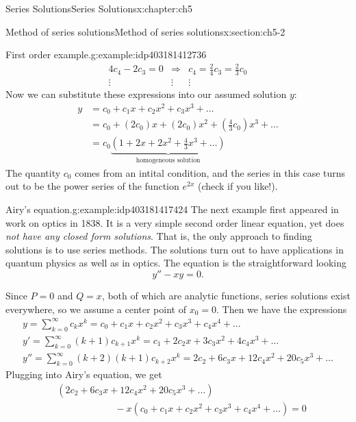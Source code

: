 \documentclass[oneside,10pt,]{book}
\numberwithin{equation}{section}
\numberwithin{equation}{section}
\newcommand{\amp}{&}
\begin{document}
\begin{chapterptx}{Series Solutions}{}{Series Solutions}{}{}{x:chapter:ch5}
\begin{sectionptx}{Method of series solutions}{}{Method of series solutions}{}{}{x:section:ch5-2}
\begin{example}{First order example.}{g:example:idp403181412736}
\begin{equation*}
\begin{array}{ccc}
4c_4 - 2c_3 = 0 \amp \Rightarrow \amp c_4 = \frac{2}{4}c_3 = \frac{2}{3} c_0 \\
\vdots \amp \vdots \amp \vdots
\end{array}
\end{equation*}
Now we can substitute these expressions into our assumed solution \(y\):%
\begin{align*}
y \amp = c_0 + c_1 x + c_2 x^2 + c_3 x^3 + \ldots\\
\amp = c_0 + (2c_0) x + (2c_0)x^2 + (\frac{4}{3}c_0)x^3 + \ldots\\
\amp = c_0\underbrace{\left(1 + 2x + 2x^2 + \frac{4}{3} x^3 + \ldots \right)}_{\text{homogeneous solution}}
\end{align*}
The quantity \(c_0\) comes from an intital condition, and the series in this case turns out to be the power series of the function \(e^{2x}\) (check if you like!).%
\end{example}
\begin{example}{Airy's equation.}{g:example:idp403181417424}%
The next example first appeared in work on optics in 1838. It is a very simple second order linear equation, yet does \emph{not have any closed form solutions}. That is, the only approach to finding solutions is to use series methods. The solutions turn out to have applications in quantum physics as well as in optics. The equation is the straightforward looking%
\begin{equation*}
y'' - x y = 0.
\end{equation*}
%
\par
Since \(P = 0\) and \(Q = x\), both of which are analytic functions, series solutions exist everywhere, so we assume a center point of \(x_0 = 0\). Then we have the expressions%
\begin{gather*}
y = \sum_{k=0}^\infty c_k x^k = c_0 + c_1 x + c_2 x^2 + c_3 x^3 + c_4 x^4 + \ldots\\
y' = \sum_{k=0}^\infty (k+1) c_{k+1} x^k = c_1 + 2c_2 x + 3 c_3 x^2 + 4 c_4 x^3 + \ldots\\
y'' = \sum_{k=0}^\infty (k+2)(k+1) c_{k+2} x^k = 2c_2 + 6c_3 x + 12 c_4 x^2 + 20c_5 x^3 + \ldots
\end{gather*}
Plugging into Airy's equation, we get%
\begin{align*}
\amp(2c_2 + 6c_3 x + 12 c_4 x^2 + 20c_5 x^3 + \ldots)\\
\amp\hspace{1in} - x(c_0 + c_1 x + c_2 x^2 + c_3 x^3 + c_4 x^4 + \ldots) = 0\\

\end{align*}
\end{example}
\end{sectionptx}
\end{chapterptx}
\end{document}
